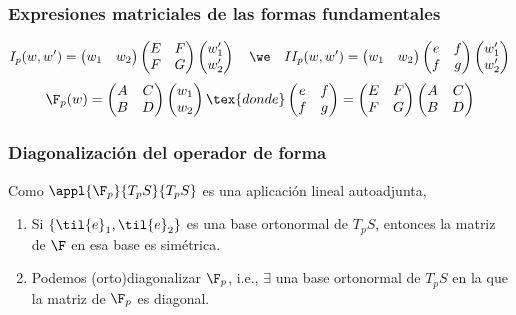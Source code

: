 \subsubsection{Expresiones matriciales de las formas fundamentales}
\[I_p(w, w') = \begin{pmatrix} w_1 & w_2 \end{pmatrix} \begin{pmatrix}
		E & F \\ F & G
	\end{pmatrix} \begin{pmatrix}
		w_1' \\ w_2'
	\end{pmatrix} \quad\we\quad II_p(w, w') = \begin{pmatrix} w_1 & w_2 \end{pmatrix} \begin{pmatrix}
		e & f \\ f & g
	\end{pmatrix} \begin{pmatrix}
		w_1' \\ w_2'
	\end{pmatrix}\]
\[\F_p(w) = \begin{pmatrix}
		A & C \\ B & D
	\end{pmatrix}\begin{pmatrix}
		w_1 \\ w_2
	\end{pmatrix}\tex{ donde } \begin{pmatrix}
		e & f \\ f & g
	\end{pmatrix} = \begin{pmatrix}
		E & F \\ F & G
	\end{pmatrix} \begin{pmatrix}
		A & C \\ B & D
	\end{pmatrix}\]

\subsubsection{Diagonalización del operador de forma}

Como $\appl{\F_p}{T_pS}{T_pS}$ es una aplicación lineal autoadjunta,
\begin{enumerate}
	\item Si $\{\til{e}_1, \til{e}_2\}$ es una base ortonormal de $T_pS$, entonces la matriz de $\F$ en esa base es simétrica.
	\item Podemos (orto)diagonalizar $\F_p$, i.e., $\exists$ una base ortonormal de $T_pS$ en la que la matriz de $\F_p$ es diagonal.
\end{enumerate}

